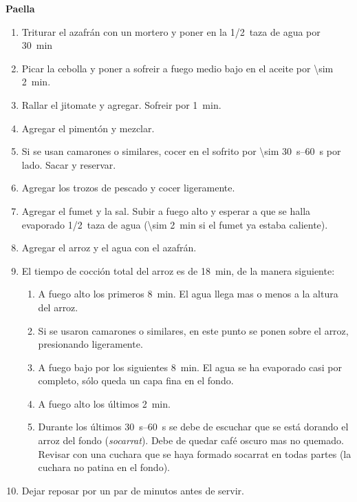 \textbf{Paella}
\begin{enumerate}
\item Triturar el azafrán con un mortero y poner en la \SI{1/2}{taza} de agua por \SI{30}{min}
\item Picar la cebolla y poner a sofreir a fuego medio bajo en el aceite por \SI{\sim 2}{min}.
\item Rallar el jitomate y agregar. Sofreir por \SI{1}{min}.
\item Agregar el pimentón y mezclar.
\item Si se usan camarones o similares, cocer en el sofrito por \SIrange{\sim 30}{60}{s} por lado. Sacar y reservar.
\item Agregar los trozos de pescado y cocer ligeramente.
\item Agregar el fumet y la sal. Subir a fuego alto y esperar a que se halla evaporado \Sim\SI{1/2}{taza} de agua (\SI{\sim 2}{min} si el fumet ya estaba caliente).
\item Agregar el arroz y el agua con el azafrán.
\item El tiempo de cocción total del arroz es de \SI{18}{min}, de la manera siguiente:
\begin{enumerate}
\item A fuego alto los primeros \SI{8}{min}. El agua llega mas o menos a la altura del arroz. 
\item Si se usaron camarones o similares, en este punto se ponen sobre el arroz, presionando ligeramente.
\item A fuego bajo por los siguientes \SI{8}{min}. El agua se ha evaporado casi por completo, sólo queda un capa fina en el fondo.
\item A fuego alto los últimos \SI{2}{min}.
\item Durante los últimos \SIrange{30}{60}{s} se debe de escuchar que se está dorando el arroz del fondo (\textit{socarrat}). Debe de quedar café oscuro mas no quemado. Revisar con una cuchara que se haya formado socarrat en todas partes (la cuchara no patina en el fondo).
\end{enumerate}
\item Dejar reposar por un par de minutos antes de servir.
\end{enumerate}